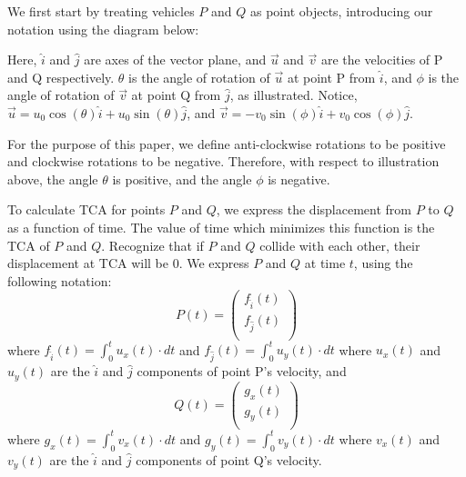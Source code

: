 \documentclass{article}
\begin{document}
We first start by treating vehicles $P$ and $Q$ as point objects, introducing our notation using the diagram below:

\begin{center}
\end{center}
Here, $\hat{i}$ and $\hat{j}$ are axes of the vector plane, and $\vec{u}$ and $\vec{v}$ are the velocities of P and Q respectively. $\theta$ is the angle of rotation of $\vec{u}$ at point P from $\hat{i}$, and $\phi$ is the angle of rotation of $\vec{v}$ at point Q from $\hat{j}$, as illustrated.  Notice, $\vec{u} = u_0 \cos(\theta)\hat{i} + u_0\sin(\theta)\hat{j}$, and $\vec{v}=-v_0\sin(\phi)\hat{i}+v_0\cos(\phi)\hat{j}$. 

For the purpose of this paper, we define anti-clockwise rotations to be positive and clockwise rotations to be negative. Therefore, with respect to illustration above, the angle $\theta$ is positive, and the angle $\phi$ is negative.

To calculate TCA for points $P$ and $Q$, we express the displacement from $P$ to $Q$ as a function of time. The value of time which minimizes this function is the TCA of $P$ and $Q$. Recognize that if $P$ and $Q$ collide with each other, their displacement at TCA will be 0.  We express $P$ and $Q$ at time $t$, using the following notation:
\begin{equation*}
    P(t) =
  \left( {\begin{array}{c}
   f_{\hat{i}}(t) \\
   f_{\hat{j}}(t) \\
  \end{array} } \right)
  \label{pt}
\end{equation*}
where $f_{\hat{i}}(t)= \int_0^t u_x(t)\cdot dt$ and $f_{\hat{j}}(t)= \int_0^t u_y(t)\cdot dt$ where $u_x(t)$ and $u_y(t)$ are the $\hat{i}$ and $\hat{j}$ components of point P's velocity, and
\begin{equation*}
    Q(t) =
  \left( {\begin{array}{c}
   g_x(t) \\
   g_y(t) \\
  \end{array} } \right)
  \label{qt}
\end{equation*}
where $g_x(t)= \int_0^t v_x(t)\cdot dt$ and $g_y(t)= \int_0^t v_y(t)\cdot dt$ where $v_x(t)$ and $v_y(t)$ are the $\hat{i}$ and $\hat{j}$ components of point Q's velocity. 
\end{document}
